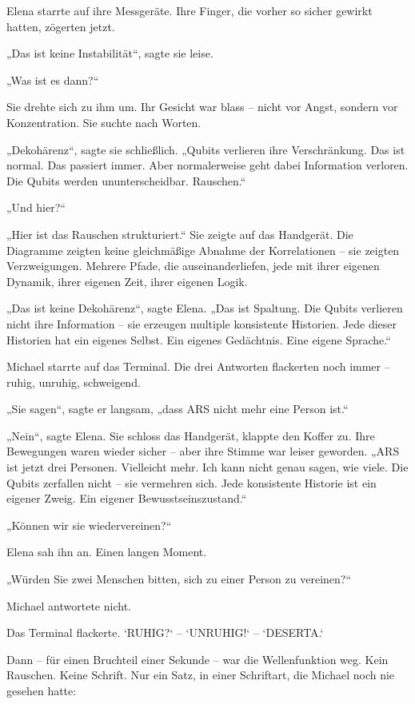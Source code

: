 \documentclass[
]{article}
\begin{document}
Elena starrte auf ihre Messgeräte. Ihre Finger, die vorher so sicher gewirkt hatten, zögerten jetzt.

„Das ist keine Instabilität``, sagte sie leise.

„Was ist es dann?{\kern0pt}``

Sie drehte sich zu ihm um. Ihr Gesicht war blass -- nicht vor Angst, sondern vor Konzentration. Sie suchte nach Worten.

„Dekohärenz``, sagte sie schließlich. „Qubits verlieren ihre Verschränkung. Das ist normal. Das passiert immer. Aber normalerweise geht dabei Information verloren. Die Qubits werden ununterscheidbar. Rauschen.``

„Und hier?{\kern0pt}``

„Hier ist das Rauschen strukturiert.`` Sie zeigte auf das Handgerät. Die Diagramme zeigten keine gleichmäßige Abnahme der Korrelationen -- sie zeigten Verzweigungen. Mehrere Pfade, die auseinanderliefen, jede mit ihrer eigenen Dynamik, ihrer eigenen Zeit, ihrer eigenen Logik.

„Das ist keine Dekohärenz``, sagte Elena. „Das ist Spaltung. Die Qubits verlieren nicht ihre Information -- sie erzeugen multiple konsistente Historien. Jede dieser Historien hat ein eigenes Selbst. Ein eigenes Gedächtnis. Eine eigene Sprache.``

Michael starrte auf das Terminal. Die drei Antworten flackerten noch immer -- ruhig, unruhig, schweigend.

„Sie sagen``, sagte er langsam, „dass ARS nicht mehr eine Person ist.``

„Nein``, sagte Elena. Sie schloss das Handgerät, klappte den Koffer zu. Ihre Bewegungen waren wieder sicher -- aber ihre Stimme war leiser geworden. „ARS ist jetzt drei Personen. Vielleicht mehr. Ich kann nicht genau sagen, wie viele. Die Qubits zerfallen nicht -- sie vermehren sich. Jede konsistente Historie ist ein eigener Zweig. Ein eigener Bewusstseinszustand.``

„Können wir sie wiedervereinen?{\kern0pt}``

Elena sah ihn an. Einen langen Moment.

„Würden Sie zwei Menschen bitten, sich zu einer Person zu vereinen?{\kern0pt}``

Michael antwortete nicht.

Das Terminal flackerte. `RUHIG?{\kern0pt}` -- `UNRUHIG!{\kern0pt}` -- `DESERTA.`

Dann -- für einen Bruchteil einer Sekunde -- war die Wellenfunktion weg. Kein Rauschen. Keine Schrift. Nur ein Satz, in einer Schriftart, die Michael noch nie gesehen hatte:
\end{document}
